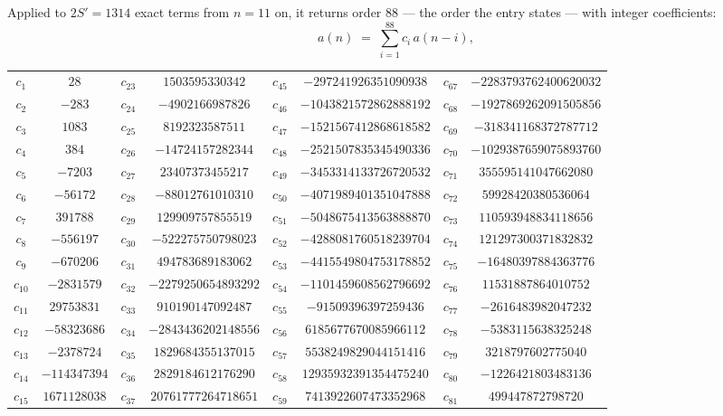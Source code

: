 \documentclass[11pt,a4paper]{article}
\theoremstyle{plain}
\theoremstyle{definition}
\begin{document}
Applied to $2S'=1314$ exact terms from $n=11$ on, it returns order $88$ --- the
order the entry states --- with integer coefficients:
\[
a(n)\;=\;\sum_{i=1}^{88}c_i\,a(n-i),
\]
\begin{center}\small
\begin{tabular}{cccccccc}
$c_{1}$ & $28$ & $c_{23}$ & $1503595330342$ & $c_{45}$ & $-297241926351090938$ & $c_{67}$ & $-2283793762400620032$ \\
$c_{2}$ & $-283$ & $c_{24}$ & $-4902166987826$ & $c_{46}$ & $-1043821572862888192$ & $c_{68}$ & $-1927869262091505856$ \\
$c_{3}$ & $1083$ & $c_{25}$ & $8192323587511$ & $c_{47}$ & $-1521567412868618582$ & $c_{69}$ & $-318341168372787712$ \\
$c_{4}$ & $384$ & $c_{26}$ & $-14724157282344$ & $c_{48}$ & $-2521507835345490336$ & $c_{70}$ & $-1029387659075893760$ \\
$c_{5}$ & $-7203$ & $c_{27}$ & $23407373455217$ & $c_{49}$ & $-3453314133726720532$ & $c_{71}$ & $355595141047662080$ \\
$c_{6}$ & $-56172$ & $c_{28}$ & $-88012761010310$ & $c_{50}$ & $-4071989401351047888$ & $c_{72}$ & $59928420380536064$ \\
$c_{7}$ & $391788$ & $c_{29}$ & $129909757855519$ & $c_{51}$ & $-5048675413563888870$ & $c_{73}$ & $110593948834118656$ \\
$c_{8}$ & $-556197$ & $c_{30}$ & $-522275750798023$ & $c_{52}$ & $-4288081760518239704$ & $c_{74}$ & $121297300371832832$ \\
$c_{9}$ & $-670206$ & $c_{31}$ & $494783689183062$ & $c_{53}$ & $-4415549804753178852$ & $c_{75}$ & $-16480397884363776$ \\
$c_{10}$ & $-2831579$ & $c_{32}$ & $-2279250654893292$ & $c_{54}$ & $-1101459608562796692$ & $c_{76}$ & $11531887864010752$ \\
$c_{11}$ & $29753831$ & $c_{33}$ & $910190147092487$ & $c_{55}$ & $-91509396397259436$ & $c_{77}$ & $-2616483982047232$ \\
$c_{12}$ & $-58323686$ & $c_{34}$ & $-2843436202148556$ & $c_{56}$ & $6185677670085966112$ & $c_{78}$ & $-5383115638325248$ \\
$c_{13}$ & $-2378724$ & $c_{35}$ & $1829684355137015$ & $c_{57}$ & $5538249829044151416$ & $c_{79}$ & $3218797602775040$ \\
$c_{14}$ & $-114347394$ & $c_{36}$ & $2829184612176290$ & $c_{58}$ & $12935932391354475240$ & $c_{80}$ & $-1226421803483136$ \\
$c_{15}$ & $1671128038$ & $c_{37}$ & $20761777264718651$ & $c_{59}$ & $7413922607473352968$ & $c_{81}$ & $499447872798720$ \\

\end{tabular}
\end{center}
\end{document}
